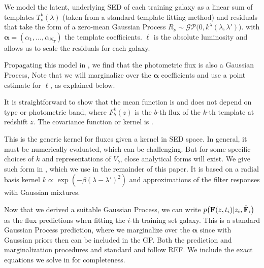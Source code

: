 \documentclass[aps,prd,showpacs,superscriptaddress,groupedaddress]{revtex4}  %
\begin{document}
We model the latent, underlying SED of each training galaxy as a linear sum of templates $T^k_\nu(\lambda)$ (\eg taken from a standard template fitting method) and residuals that take the form of a zero-mean Gaussian Process $R_\nu \sim \mathcal{GP}\bigl(0, k^\lambda(\lambda,\lambda') \bigr)$.
with $\bm{\alpha}=(\alpha_1, \dots, \alpha_{N_T})$ the template coefficients. 
$\ell$ is the absolute luminosity and allows us to scale the residuals for each galaxy. 

Propagating this model in , we find that the photometric flux is also a Gaussian Process,
Note that we will marginalize over the $\bm{\alpha}$ coefficients and use a point estimate for $\ell$, as explained below.

It is straightforward to show that the mean function is
and does not depend on type or photometric band, where $F^k_b(z)$ is the $b$-th flux of the $k$-th template at redshift $z$.
The covariance function or kernel is
.

This is the generic kernel for fluxes given a kernel in SED space. 
In general, it must be numerically evaluated, which can be challenging. 
But for some specific choices of $k$ and representations of $V_b$, close analytical forms will exist. 
We give such form in , which we use in the remainder of this paper. 
It is based on a radial basis kernel $k\propto \exp(-\beta(\lambda-\lambda')^2)$ and approximations of the filter responses with Gaussian mixtures.

Now that we derived a suitable Gaussian Process, we can write $p\bigl( \mat{F}(z,t_i) | z_i, \hat{\mat{F}}_i\bigr)$ as the flux predictions when fitting the $i$-th training set galaxy. 
This is a standard Gaussian Process prediction, where we marginalize over the $\bm{\alpha}$ since with Gaussian priors then can be included in the GP. 
Both the prediction and marginalization procedures and standard and follow REF. 
We include the exact equations we solve in  for completeness.
\end{document}
